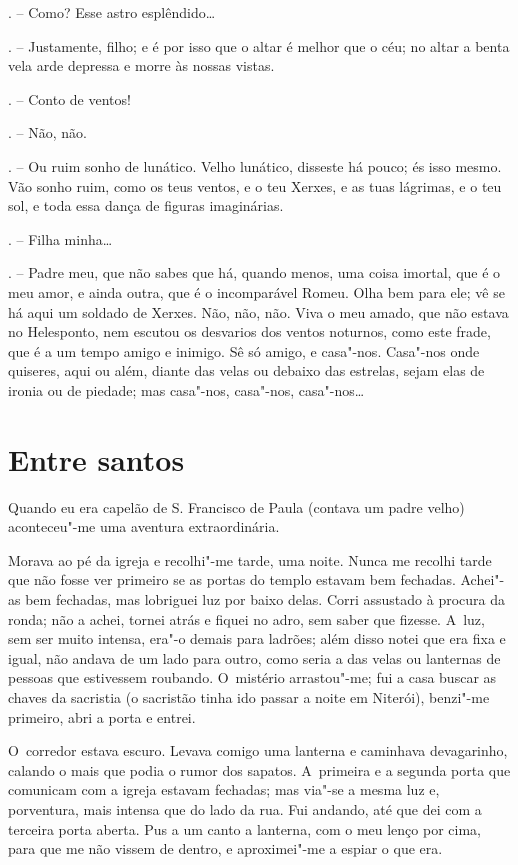 \begin{Parskip}
. -- Como? Esse astro esplêndido\ldots{}

. -- Justamente, filho; e é por isso que o altar é melhor
que o céu; no altar a benta vela arde depressa e morre às nossas vistas.

. -- Conto de ventos!

. -- Não, não.

. -- Ou ruim sonho de lunático. Velho lunático, disseste há
pouco; és isso mesmo. Vão sonho ruim, como os teus ventos, e o teu
Xerxes, e as tuas lágrimas, e o teu sol, e toda essa dança de figuras
imaginárias.

. -- Filha minha\ldots{}

. -- Padre meu, que não sabes que há, quando menos, uma coisa
imortal, que é o meu amor, e ainda outra, que é o incomparável Romeu.
Olha bem para ele; vê se há aqui um soldado de Xerxes. Não, não, não.
Viva o meu amado, que não estava no Helesponto, nem escutou os desvarios
dos ventos noturnos, como este frade, que é a um tempo amigo e inimigo.
Sê só amigo, e casa"-nos. Casa"-nos onde quiseres, aqui ou além, diante
das velas ou debaixo das estrelas, sejam elas de ironia ou de piedade;
mas casa"-nos, casa"-nos, casa"-nos\ldots{}
\end{Parskip}

\chapter{Entre santos}

Quando eu era capelão de S. Francisco de Paula (contava um padre velho)
aconteceu"-me uma aventura extraordinária.

Morava ao pé da igreja e recolhi"-me tarde, uma noite. Nunca me recolhi
tarde que não fosse ver primeiro se as portas do templo estavam bem
fechadas. Achei"-as bem fechadas, mas lobriguei luz por baixo delas.
Corri assustado à procura da ronda; não a achei, tornei atrás e fiquei
no adro, sem saber que fizesse. A~luz, sem ser muito intensa, era"-o
demais para ladrões; além disso notei que era fixa e igual, não andava
de um lado para outro, como seria a das velas ou lanternas de pessoas
que estivessem roubando. O~mistério arrastou"-me; fui a casa buscar as
chaves da sacristia (o sacristão tinha ido passar a noite em Niterói),
benzi"-me primeiro, abri a porta e entrei.

O~corredor estava escuro. Levava comigo uma lanterna e caminhava
devagarinho, calando o mais que podia o rumor dos sapatos. A~primeira e
a segunda porta que comunicam com a igreja estavam fechadas; mas via"-se
a mesma luz e, porventura, mais intensa que do lado da rua. Fui andando,
até que dei com a terceira porta aberta. Pus a um canto a lanterna, com
o meu lenço por cima, para que me não vissem de dentro, e aproximei"-me a
espiar o que era.

